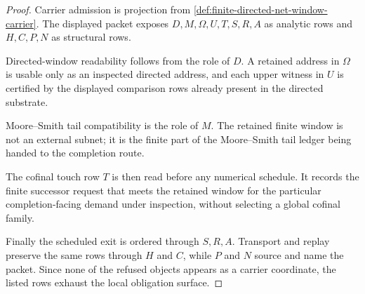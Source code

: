 \begin{proof}
Carrier admission is projection from \autoref{def:finite-directed-net-window-carrier}. The displayed packet exposes $D,M,\Omega,U,T,S,R,A$ as analytic rows and $H,C,P,N$ as structural rows.

Directed-window readability follows from the role of $D$. A retained address in $\Omega$ is usable only as an inspected directed address, and each upper witness in $U$ is certified by the displayed comparison rows already present in the directed substrate.

Moore--Smith tail compatibility is the role of $M$. The retained finite window is not an external subnet; it is the finite part of the Moore--Smith tail ledger being handed to the completion route.

The cofinal touch row $T$ is then read before any numerical schedule. It records the finite successor request that meets the retained window for the particular completion-facing demand under inspection, without selecting a global cofinal family.

Finally the scheduled exit is ordered through $S,R,A$. Transport and replay preserve the same rows through $H$ and $C$, while $P$ and $N$ source and name the packet. Since none of the refused objects appears as a carrier coordinate, the listed rows exhaust the local obligation surface.
\end{proof}


